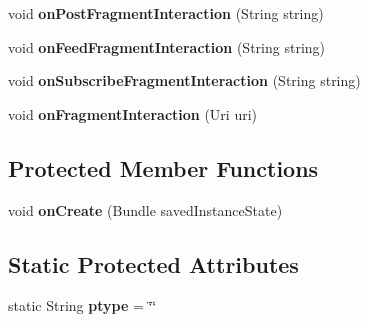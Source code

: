 \begin{DoxyCompactItemize}
\item 
\hypertarget{classcom_1_1example_1_1sel_1_1lostfound_1_1FeedActivity_a93cd51363a21d0dd0368eca17f91aa31}{void {\bfseries on\-Post\-Fragment\-Interaction} (\-String string)}\label{classcom_1_1example_1_1sel_1_1lostfound_1_1FeedActivity_a93cd51363a21d0dd0368eca17f91aa31}

\item 
\hypertarget{classcom_1_1example_1_1sel_1_1lostfound_1_1FeedActivity_a387420f45593f43ed8a998fabd4e1840}{void {\bfseries on\-Feed\-Fragment\-Interaction} (\-String string)}\label{classcom_1_1example_1_1sel_1_1lostfound_1_1FeedActivity_a387420f45593f43ed8a998fabd4e1840}

\item 
\hypertarget{classcom_1_1example_1_1sel_1_1lostfound_1_1FeedActivity_a2933085fa5342bd11b601c37120d850e}{void {\bfseries on\-Subscribe\-Fragment\-Interaction} (\-String string)}\label{classcom_1_1example_1_1sel_1_1lostfound_1_1FeedActivity_a2933085fa5342bd11b601c37120d850e}

\item 
\hypertarget{classcom_1_1example_1_1sel_1_1lostfound_1_1FeedActivity_a15280442a0b2314b06299d1d57318827}{void {\bfseries on\-Fragment\-Interaction} (\-Uri uri)}\label{classcom_1_1example_1_1sel_1_1lostfound_1_1FeedActivity_a15280442a0b2314b06299d1d57318827}

\end{DoxyCompactItemize}
\subsection*{\-Protected \-Member \-Functions}
\begin{DoxyCompactItemize}
\item 
\hypertarget{classcom_1_1example_1_1sel_1_1lostfound_1_1FeedActivity_a27dee5594c91dcb9216364c9556c4af7}{void {\bfseries on\-Create} (\-Bundle saved\-Instance\-State)}\label{classcom_1_1example_1_1sel_1_1lostfound_1_1FeedActivity_a27dee5594c91dcb9216364c9556c4af7}

\end{DoxyCompactItemize}
\subsection*{\-Static \-Protected \-Attributes}
\begin{DoxyCompactItemize}
\item 
\hypertarget{classcom_1_1example_1_1sel_1_1lostfound_1_1FeedActivity_a485e807a263274d664ce60fae23ebb45}{static \-String {\bfseries ptype} = \char`\"{}\char`\"{}}\label{classcom_1_1example_1_1sel_1_1lostfound_1_1FeedActivity_a485e807a263274d664ce60fae23ebb45}

\end{DoxyCompactItemize}
